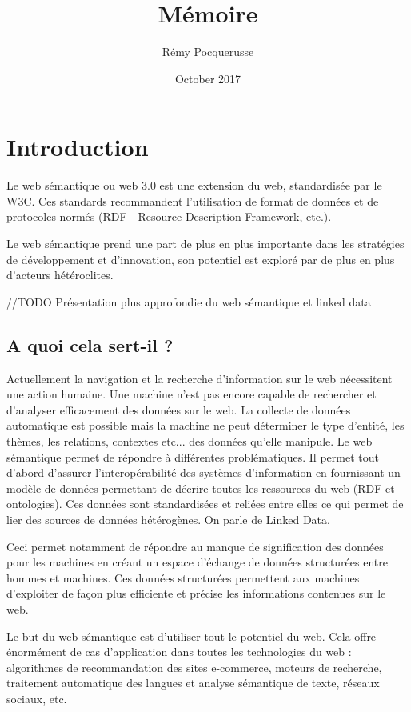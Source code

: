 \documentclass[12pt]{article}
\title{Mémoire}
\author{Rémy Pocquerusse}
\date{October 2017}
\begin{document}
\maketitle

\clearpage

\section{Introduction}

Le web sémantique ou web 3.0 est une extension du web, standardisée par le W3C. Ces standards recommandent l'utilisation de format de données et de protocoles normés (RDF - Resource Description Framework, etc.).

Le web sémantique prend une part de plus en plus importante dans les stratégies de développement et d'innovation, son potentiel est exploré par de plus en plus d'acteurs hétéroclites. \cite{sw-evolution}

//TODO Présentation plus approfondie du web sémantique et linked data

\subsection{A quoi cela sert-il ?}

Actuellement la navigation et la recherche d'information sur le web nécessitent une action humaine. Une machine n'est pas encore capable de rechercher et d'analyser efficacement des données sur le web. La collecte de données automatique est possible mais la machine ne peut déterminer le type d'entité, les thèmes, les relations, contextes etc... des données qu'elle manipule.
Le web sémantique permet de répondre à différentes problématiques. Il permet tout d'abord d'assurer l'interopérabilité des systèmes d'information en fournissant un modèle de données permettant de décrire toutes les ressources du web (RDF et ontologies). Ces données sont standardisées et reliées entre elles ce qui permet de lier des sources de données hétérogènes. On parle de Linked Data. \cite{tim-ted}

Ceci permet notamment de répondre au manque de signification des données pour les machines en créant un espace d'échange de données structurées entre hommes et machines. Ces données structurées permettent aux machines d'exploiter de façon plus efficiente et précise les informations contenues sur le web. 

Le but du web sémantique est d'utiliser tout le potentiel du web. Cela offre énormément de cas d'application dans toutes les technologies du web : algorithmes de recommandation des sites e-commerce, moteurs de recherche, traitement automatique des langues et analyse sémantique de texte, réseaux sociaux, etc. \cite{sw-8-applications} \cite{sw-to}
\end{document}
